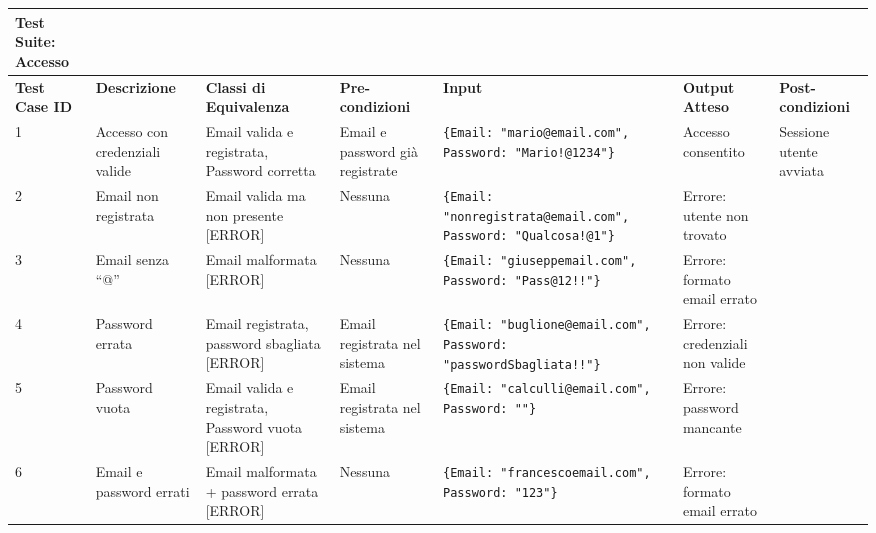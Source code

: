 \begin{sidewaystable}
\begin{tabular}{|p{2cm}|p{2cm}|p{2cm}|p{2cm}|p{5cm}|p{2cm}|p{2cm}|}
\hline
\rowcolor{SkyBlue}
\textbf{Test Suite: Accesso} & & & & & &\\
\hline
\rowcolor{Red}
\textbf{Test Case ID} & \textbf{Descrizione} & \textbf{Classi di Equivalenza} & \textbf{Pre-condizioni} & \textbf{Input} & \textbf{Output Atteso} & \textbf{Post-condizioni} \\
\hline
1 & Accesso con credenziali valide & Email valida e registrata, Password corretta & Email e password già registrate & \texttt{\{Email: "mario@email.com", Password: "Mario!@1234"\}} & Accesso consentito & Sessione utente avviata \\
\hline
2 & Email non registrata & Email valida ma non presente [ERROR] & Nessuna & \texttt{\{Email: "nonregistrata@email.com", Password: "Qualcosa!@1"\}} & Errore: utente non trovato & \\
\hline
3 & Email senza “@” & Email malformata [ERROR] & Nessuna & \texttt{\{Email: "giuseppemail.com", Password: "Pass@12!!"\}} & Errore: formato email errato & \\
\hline
4 & Password errata & Email registrata, password sbagliata [ERROR] & Email registrata nel sistema & \texttt{\{Email: "buglione@email.com", Password: "passwordSbagliata!!"\}} & Errore: credenziali non valide & \\
\hline
5 & Password vuota & Email valida e registrata, Password vuota [ERROR] & Email registrata nel sistema & \texttt{\{Email: "calculli@email.com", Password: ""\}} & Errore: password mancante & \\
\hline
6 & Email e password errati & Email malformata + password errata [ERROR] & Nessuna & \texttt{\{Email: "francescoemail.com", Password: "123"\}} & Errore: formato email errato & \\
\hline
\end{tabular}
\end{sidewaystable}

